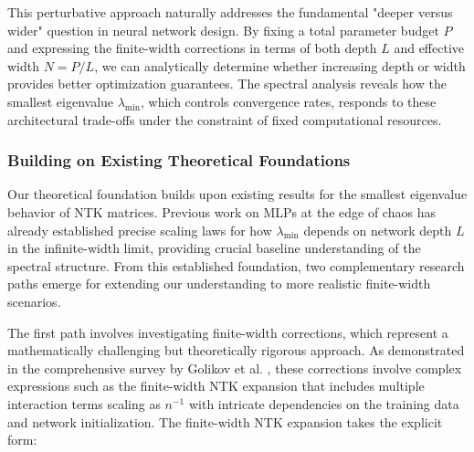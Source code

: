 \documentclass{article}
\begin{document}
This perturbative approach naturally addresses the fundamental "deeper versus wider" question in neural network design. By fixing a total parameter budget $P$ and expressing the finite-width corrections in terms of both depth $L$ and effective width $N = P/L$, we can analytically determine whether increasing depth or width provides better optimization guarantees. The spectral analysis reveals how the smallest eigenvalue $\lambda_{\min}$, which controls convergence rates, responds to these architectural trade-offs under the constraint of fixed computational resources.

\subsubsection{Building on Existing Theoretical Foundations}

Our theoretical foundation builds upon existing results for the smallest eigenvalue behavior of NTK matrices. Previous work on MLPs at the edge of chaos has already established precise scaling laws for how $\lambda_{\min}$ depends on network depth $L$ in the infinite-width limit, providing crucial baseline understanding of the spectral structure. From this established foundation, two complementary research paths emerge for extending our understanding to more realistic finite-width scenarios.

The first path involves investigating finite-width corrections, which represent a mathematically challenging but theoretically rigorous approach. As demonstrated in the comprehensive survey by Golikov et al. \cite{golikov2022neural}, these corrections involve complex expressions such as the finite-width NTK expansion that includes multiple interaction terms scaling as $n^{-1}$ with intricate dependencies on the training data and network initialization. The finite-width NTK expansion takes the explicit form:
\end{document}
